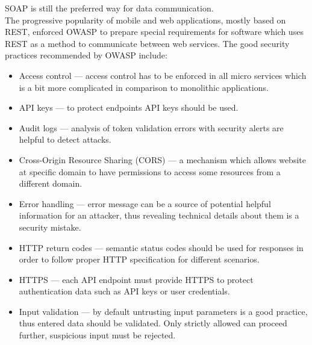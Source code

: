 \documentclass{article} %
\begin{document}
SOAP is still the preferred way for data communication.\\
\newline
The progressive popularity of mobile and web applications, mostly based on REST, enforced OWASP to prepare special requirements for software which uses REST as a method to communicate between web services. The good security practices recommended by OWASP \cite{bib:owasp_rest_security} include:
\begin{itemize}
    \item Access control --- access control has to be enforced in all micro services which is a bit more complicated in comparison to monolithic applications.
    \item API keys --- to protect endpoints API keys should be used.
    \item Audit logs --- analysis of token validation errors with security alerts are helpful to detect attacks.
    \item Cross-Origin Resource Sharing (CORS) --- a mechanism which allows website at specific domain to have permissions to access some resources from a different domain.
    \item Error handling --- error message can be a source of potential helpful information for an attacker, thus revealing technical details about them is a security mistake.
    \item HTTP return codes --- semantic status codes should be used for responses in order to follow proper HTTP specification for different scenarios.
    \item HTTPS --- each API endpoint must provide HTTPS to protect authentication data such as API keys or user credentials.
    \item Input validation --- by default untrusting input parameters is a good practice, thus entered data should be validated. Only strictly allowed can proceed further, suspicious input must be rejected. 

\end{itemize}
\end{document}
